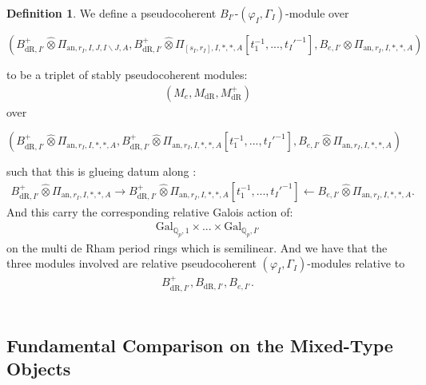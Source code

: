 \documentclass[12pt]{amsart}
\theoremstyle{definition}
\newtheorem{definition}[theorem]{Definition}
\numberwithin{equation}{section}
\begin{document}
\begin{definition}
We define a pseudocoherent $B_{I'}$-$(\varphi_I,\Gamma_I)$-module over
\begin{center}
$(B^+_{\mathrm{dR},I'}	\widehat{\otimes}\Pi_{\mathrm{an},r_{I},I,J,I\backslash J,A},B^+_{\mathrm{dR},I'}	\widehat{\otimes}\Pi_{[s_I,r_I],I,*,*,A}[t_1^{-1},...,t_I'^{-1}],B_{e,I'}	\widehat{\otimes}\Pi_{\mathrm{an},r_{I},I,*,*,A})$	
\end{center}
to be a triplet of stably pseudocoherent modules:
\begin{align}
(M_e,M_{\mathrm{dR}},M^+_{\mathrm{dR}})	
\end{align}
over 
\begin{center}
$(B^+_{\mathrm{dR},I'}	\widehat{\otimes}\Pi_{\mathrm{an},r_{I},I,*,*,A},B^+_{\mathrm{dR},I'}	\widehat{\otimes}\Pi_{\mathrm{an},r_{I},I,*,*,A}[t_1^{-1},...,t_I'^{-1}],B_{e,I'}	\widehat{\otimes}\Pi_{\mathrm{an},r_{I},I,*,*,A})$	
\end{center}
such that this is glueing datum along :
\begin{align}
B^+_{\mathrm{dR},I'}	\widehat{\otimes}\Pi_{\mathrm{an},r_{I},I,*,*,A}\rightarrow B^+_{\mathrm{dR},I'}	\widehat{\otimes}\Pi_{\mathrm{an},r_{I},I,*,*,A}[t_1^{-1},...,t_I'^{-1}] \leftarrow B_{e,I'}	\widehat{\otimes}\Pi_{\mathrm{an},r_{I},I,*,*,A}.	
\end{align}
And this carry the corresponding relative Galois action of:
\begin{align}
\mathrm{Gal}_{\mathbb{Q}_p,1}\times...\times \mathrm{Gal}_{\mathbb{Q}_p,I'}		
\end{align}
on the multi de Rham period rings which is semilinear. And we have that the three modules involved are relative pseudocoherent $(\varphi_I,\Gamma_I)$-modules relative to
\begin{align}
B^+_{\mathrm{dR},I'},B_{\mathrm{dR},I'},B_{e,I'}.	
\end{align}\\

	
\end{definition}


\subsection{Fundamental Comparison on the Mixed-Type Objects}
\end{document}

